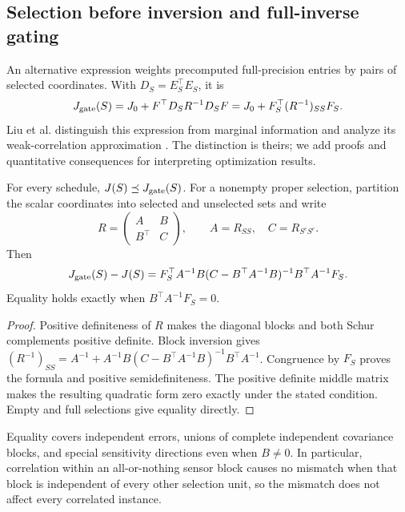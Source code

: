 \subsection{Selection before inversion and full-inverse gating}
\label{subsec:gating}
An alternative expression weights precomputed full-precision entries by
pairs of selected coordinates. With $D_S=E_S^\top E_S$, it is
\begin{equation}
 J_{\mathrm{gate}}(S)=J_0+F^\top D_SR^{-1}D_SF
 =J_0+F_S^\top(R^{-1})_{SS}F_S.
 \label{eq:gated-information}
\end{equation}
Liu et al. distinguish this expression from marginal information and analyze
its weak-correlation approximation \citep[Sec.~IV]{Liu2016}. The distinction
is theirs; we add proofs and quantitative consequences for interpreting
optimization results.

\begin{proposition}
\label{prop:gating}
For every schedule, $J(S)\preceq J_{\mathrm{gate}}(S)$. For a nonempty proper
selection, partition the scalar coordinates into selected and unselected
sets and write
\[
 R=\begin{pmatrix}A&B\\B^\top&C\end{pmatrix},\qquad
 A=R_{SS},\quad C=R_{S^cS^c}.
\]
Then
\begin{equation}
 J_{\mathrm{gate}}(S)-J(S)=F_S^\top A^{-1}B
 (C-B^\top A^{-1}B)^{-1}B^\top A^{-1}F_S.
 \label{eq:gating-gap}
\end{equation}
Equality holds exactly when $B^\top A^{-1}F_S=0$.
\end{proposition}
\begin{proof}
Positive definiteness of $R$ makes the diagonal blocks and both Schur
complements positive definite. Block inversion gives
$(R^{-1})_{SS}=A^{-1}+A^{-1}B(C-B^\top A^{-1}B)^{-1}B^\top A^{-1}$.
Congruence by $F_S$ proves the formula and positive semidefiniteness.
The positive definite middle matrix makes the resulting quadratic form zero
exactly under the stated condition. Empty and full selections give equality
directly.
\end{proof}
Equality covers independent errors, unions of complete independent
covariance blocks, and special sensitivity directions even when $B\ne0$.
In particular, correlation within an all-or-nothing sensor block causes no
mismatch when that block is independent of every other selection unit, so
the mismatch does not affect every correlated instance.

